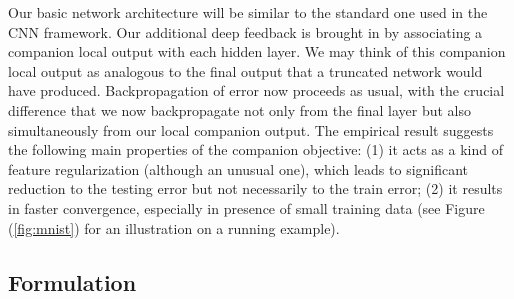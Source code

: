 \documentclass{article} %
\begin{document}

Our basic network architecture will be similar to the standard one used in the CNN framework. Our additional deep feedback is brought in by associating a companion local output with each hidden layer.  We may think of this companion local output as analogous to the final output that a truncated network would have produced.
Backpropagation of error now proceeds as usual, with the crucial difference that we now backpropagate not only from the final layer but also simultaneously from our local companion output. The empirical result suggests the following main properties of the companion objective: {(1) it acts as a kind of feature regularization (although an unusual one), which leads to significant reduction to the testing error but not necessarily to the train error; (2) it results in faster convergence, especially in presence of small training data (see Figure (\ref{fig:mnist}) for an illustration on a running example).}

\subsection{Formulation}
\end{document}
